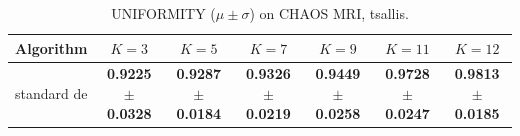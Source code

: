 \begin{table}[htbp]
\centering
\caption{UNIFORMITY ($\mu \pm \sigma$) on CHAOS MRI, tsallis.}
\label{tab:exp2-tsallis-uniformity}
\begin{tabular}{lcccccc}
\toprule
Algorithm & $K=3$ & $K=5$ & $K=7$ & $K=9$ & $K=11$ & $K=12$ \\
\midrule
standard de & \textbf{0.9225 $\pm$ 0.0328} & \textbf{0.9287 $\pm$ 0.0184} & \textbf{0.9326 $\pm$ 0.0219} & \textbf{0.9449 $\pm$ 0.0258} & \textbf{0.9728 $\pm$ 0.0247} & \textbf{0.9813 $\pm$ 0.0185} \\
\bottomrule
\end{tabular}
\end{table}